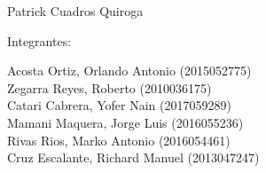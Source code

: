 \documentclass[12pt,letterpaper]{article}
\begin{document}
\begin{titlepage}
\begin{center}
\vspace*{0.1in}
\begin{large}
 Patrick Cuadros Quiroga\\
\end{large}
\vspace*{0.2in}
\vspace*{0.1in}
\begin{large}
Integrantes: \\
\begin{flushleft}
Acosta Ortiz, Orlando Antonio                  \hfill	(2015052775) \\
Zegarra Reyes, Roberto  		            \hfill 	(2010036175) \\
Catari Cabrera, Yofer Nain 		\hfill 	(2017059289) \\
Mamani Maquera, Jorge Luis                   \hfill 	(2016055236) \\
Rivas Rios, Marko Antonio                       \hfill 	(2016054461) \\
Cruz Escalante, Richard Manuel             \hfill 	(2013047247) \\
\end{flushleft}
\end{large}
\end{center}

\end{titlepage}


\tableofcontents %
\thispagestyle{empty} %
\newpage
\setcounter{page}{1} %








\end{document}
